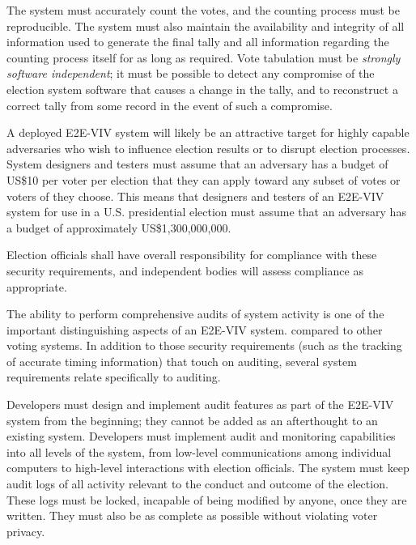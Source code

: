 The system must accurately count the votes, and the counting process
must be reproducible. The system must also maintain the availability
and integrity of all information used to generate the final tally and
all information regarding the counting process itself for as long as
required. Vote tabulation must be \emph{strongly software
  independent}; it must be possible to detect any compromise of the
election system software that causes a change in the tally, and to
reconstruct a correct tally from some record in the event of such a
compromise.

A deployed E2E-VIV system will likely be an attractive target for
highly capable adversaries who wish to influence election results or
to disrupt election processes. System designers and testers must
assume that an adversary has a budget of US\$10 per voter per election
that they can apply toward any subset of votes or voters of they
choose. This means that designers and testers of an E2E-VIV system for
use in a U.S. presidential election must assume that an adversary has
a budget of approximately US\$1,300,000,000.

Election officials shall have overall responsibility for compliance
with these security requirements, and independent bodies will assess
compliance as appropriate.


The ability to perform comprehensive audits of system activity is one
of the important distinguishing aspects of an E2E-VIV system.
compared to other voting systems. In addition to those security
requirements (such as the tracking of accurate timing information)
that touch on auditing, several system requirements relate
specifically to auditing.

Developers must design and implement audit features as part of the
E2E-VIV system from the beginning; they cannot be added as an
afterthought to an existing system. Developers must implement audit
and monitoring capabilities into all levels of the system, from
low-level communications among individual computers to high-level
interactions with election officials. The system must keep audit logs
of all activity relevant to the conduct and outcome of the
election. These logs must be locked, incapable of being modified by
anyone, once they are written. They must also be as complete as
possible without violating voter privacy.

